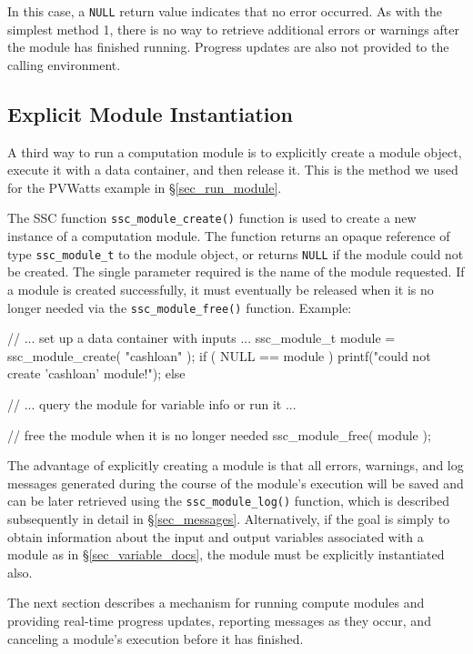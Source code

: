 \documentclass{scrartcl} %
\begin{document}
In this case, a \texttt{NULL} return value indicates that no error occurred.  As with the simplest method 1, there is no way to retrieve additional errors or warnings after the module has finished running.  Progress updates are also not provided to the calling environment.

\subsection{Explicit Module Instantiation}
\label{sec_explicit_modules}

A third way to run a computation module is to explicitly create a module object, execute it with a data container, and then release it.  This is the method we used for the PVWatts example in \S\ref{sec_run_module}.

The SSC function \texttt{ssc\_module\_create()} function is used to create a new instance of a computation module.  The function returns an opaque reference of type \texttt{ssc\_module\_t} to the module object, or returns \texttt{NULL} if the module could not be created.  The single parameter required is the name of the module requested.  If a module is created successfully, it must eventually be released when it is no longer needed via the \texttt{ssc\_module\_free()} function.  Example:

\begin{verbatimtab}[4]
// ... set up a data container with inputs ...
ssc_module_t module = ssc_module_create( "cashloan" );
if ( NULL == module )
	printf("could not create 'cashloan' module!\n");
else
{
	// ... query the module for variable info or run it ...

	// free the module when it is no longer needed
	ssc_module_free( module );
}
\end{verbatimtab}

The advantage of explicitly creating a module is that all errors, warnings, and log messages generated during the course of the module's execution will be saved and can be later retrieved using the \texttt{ssc\_module\_log()} function, which is described subsequently in detail in \S\ref{sec_messages}.  Alternatively, if the goal is simply to obtain information about the input and output variables associated with a module as in \S\ref{sec_variable_docs}, the module must be explicitly instantiated also.

The next section describes a mechanism for running compute modules and providing real-time progress updates, reporting messages as they occur, and canceling a module's execution before it has finished.
\end{document}
